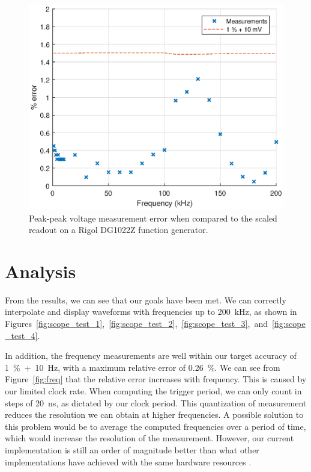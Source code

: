 \documentclass[journal,hidelinks]{IEEEtran}
\begin{document}
\begin{figure}[!htb]
  \centering
  \includegraphics[width=\columnwidth]{test-results/voltpp.eps}
  \caption{Peak-peak voltage measurement error when compared to the scaled readout on a Rigol DG1022Z function generator.}
  \label{fig:voltpp}
\end{figure}

\section{Analysis}

From the results, we can see that our goals have been met. We can correctly interpolate and display waveforms with frequencies up to 200~kHz, as shown in Figures~\ref{fig:scope_test_1},~\ref{fig:scope_test_2},~\ref{fig:scope_test_3},~and~\ref{fig:scope_test_4}.

In addition, the frequency measurements are well within our target accuracy of 1~\%~+~10~Hz, with a maximum relative error of 0.26~\%. We can see from Figure~\ref{fig:freq} that the relative error increases with frequency. This is caused by our limited clock rate. When computing the trigger period, we can only count in steps of 20~ns, as dictated by our clock period. This quantization of measurement reduces the resolution we can obtain at higher frequencies. A possible solution to this problem would be to average the computed frequencies over a period of time, which would increase the resolution of the measurement. However, our current implementation is still an order of magnitude better than what other implementations have achieved with the same hardware resources \cite{jin_digital_2016}.
\end{document}
